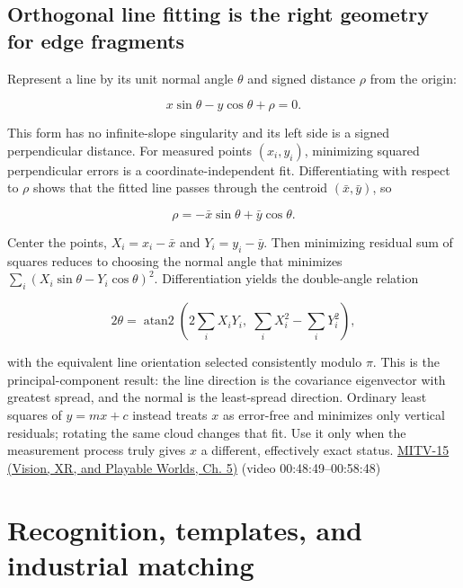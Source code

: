 \subsection{Orthogonal line fitting is the right geometry for edge fragments}\label{04-visual-computing-ii-ch030-orthogonal-line-fitting-is-the-right-geometry-for-edge-fragments}

\hypertarget{04-visual-computing-ii-ch030-orthogonal-line-fitting-is-the-right-geometry-for-edge-fragments}{}

Represent a line by its unit normal angle \(\theta\) and signed distance \(\rho\) from the origin:

\[
x\sin\theta-y\cos\theta+\rho=0.
\]

This form has no infinite-slope singularity and its left side is a signed perpendicular distance. For measured points \((x_i,y_i)\), minimizing squared perpendicular errors is a coordinate-independent fit. Differentiating with respect to \(\rho\) shows that the fitted line passes through the centroid \((\bar x,\bar y)\), so

\[
\rho=-\bar x\sin\theta+\bar y\cos\theta.
\]

Center the points, \(X_i=x_i-\bar x\) and \(Y_i=y_i-\bar y\). Then minimizing residual sum of squares reduces to choosing the normal angle that minimizes \(\sum_i(X_i\sin\theta-Y_i\cos\theta)^2\). Differentiation yields the double-angle relation

\[
2\theta=\operatorname{atan2}\left(2\sum_iX_iY_i,\;\sum_iX_i^2-\sum_iY_i^2\right),
\]

with the equivalent line orientation selected consistently modulo \(\pi\). This is the principal-component result: the line direction is the covariance eigenvector with greatest spread, and the normal is the least-spread direction. Ordinary least squares of \(y=mx+c\) instead treats \(x\) as error-free and minimizes only vertical residuals; rotating the same cloud changes that fit. Use it only when the measurement process truly gives \(x\) a different, effectively exact status. \href{../07-Vision-XR-and-Playable-Worlds/main.pdf\#nameddest=04-visual-computing-ii-ch036-mitv-15---alignment-patmax-distance-field-filtering-and-sub-sampling-us-7065262}{MITV-15 (Vision, XR, and Playable Worlds, Ch. 5)} (video 00:48:49--00:58:48)

\section{Recognition, templates, and industrial matching}\label{04-visual-computing-ii-ch030-recognition-templates-and-industrial-matching}

